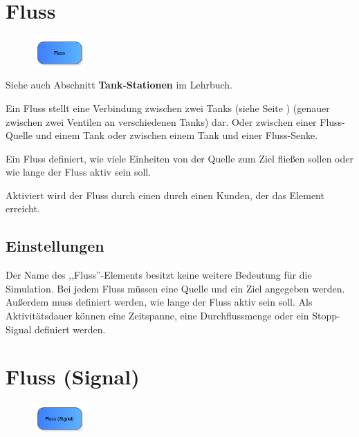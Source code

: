 \section{Fluss}
\label{ref:ModelElementTankFlowByClient}

\begin{figure}
\vspace{-22pt}
\includegraphics[width=2cm]{imageModelElementTankFlowByClient.png}
\vspace{-22pt}
\end{figure}

Siehe auch Abschnitt \textbf{Tank-Stationen} im Lehrbuch.

Ein Fluss stellt eine Verbindung zwischen zwei Tanks (siehe Seite \pageref{ref:ModelElementTank}) 
(genauer zwischen zwei Ventilen an verschiedenen Tanks) dar.
Oder zwischen einer Fluss-Quelle und einem Tank oder zwischen einem Tank und einer Fluss-Senke.

Ein Fluss definiert, wie viele Einheiten von der Quelle zum Ziel fließen sollen oder wie
lange der Fluss aktiv sein soll.

Aktiviert wird der Fluss durch einen durch einen Kunden, der das Element erreicht.

\subsection*{Einstellungen}

Der Name des ,,Fluss''-Elements besitzt keine weitere Bedeutung für die Simulation.
Bei jedem Fluss müssen eine Quelle und ein Ziel angegeben werden.
Außerdem muss definiert werden, wie lange der Fluss aktiv sein soll. Als Aktivitätsdauer
können eine Zeitspanne, eine Durchflussmenge oder ein Stopp-Signal definiert werden.


\section{Fluss (Signal)}
\label{ref:ModelElementTankFlowBySignal}

\begin{figure}
\vspace{-22pt}
\includegraphics[width=2cm]{imageModelElementTankFlowBySignal.png}
\vspace{-22pt}
\end{figure}

